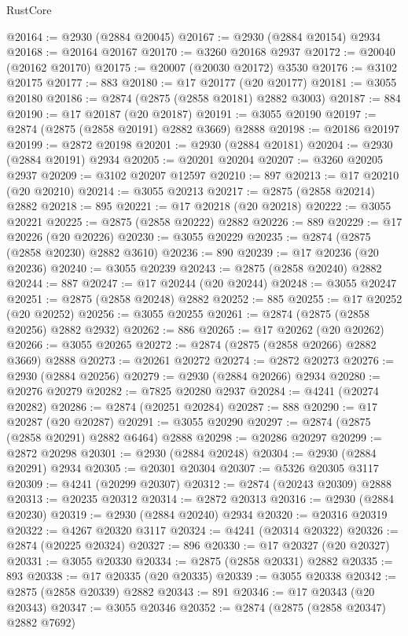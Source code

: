 \begin{lexlean}{RustCore}
\begin{coremodule}
@20164 := @2930 (@2884 @20045)
@20167 := @2930 (@2884 @20154) @2934
@20168 := @20164 @20167
@20170 := @3260 @20168 @2937
@20172 := @20040 (@20162 @20170)
@20175 := @20007 (@20030 @20172) @3530
@20176 := @3102 @20175
@20177 := 883
@20180 := @17 @20177 (@20 @20177)
@20181 := @3055 @20180
@20186 := @2874 (@2875 (@2858 @20181) @2882 @3003)
@20187 := 884
@20190 := @17 @20187 (@20 @20187)
@20191 := @3055 @20190
@20197 := @2874 (@2875 (@2858 @20191) @2882 @3669) @2888
@20198 := @20186 @20197
@20199 := @2872 @20198
@20201 := @2930 (@2884 @20181)
@20204 := @2930 (@2884 @20191) @2934
@20205 := @20201 @20204
@20207 := @3260 @20205 @2937
@20209 := @3102 @20207 @12597
@20210 := 897
@20213 := @17 @20210 (@20 @20210)
@20214 := @3055 @20213
@20217 := @2875 (@2858 @20214) @2882
@20218 := 895
@20221 := @17 @20218 (@20 @20218)
@20222 := @3055 @20221
@20225 := @2875 (@2858 @20222) @2882
@20226 := 889
@20229 := @17 @20226 (@20 @20226)
@20230 := @3055 @20229
@20235 := @2874 (@2875 (@2858 @20230) @2882 @3610)
@20236 := 890
@20239 := @17 @20236 (@20 @20236)
@20240 := @3055 @20239
@20243 := @2875 (@2858 @20240) @2882
@20244 := 887
@20247 := @17 @20244 (@20 @20244)
@20248 := @3055 @20247
@20251 := @2875 (@2858 @20248) @2882
@20252 := 885
@20255 := @17 @20252 (@20 @20252)
@20256 := @3055 @20255
@20261 := @2874 (@2875 (@2858 @20256) @2882 @2932)
@20262 := 886
@20265 := @17 @20262 (@20 @20262)
@20266 := @3055 @20265
@20272 := @2874 (@2875 (@2858 @20266) @2882 @3669) @2888
@20273 := @20261 @20272
@20274 := @2872 @20273
@20276 := @2930 (@2884 @20256)
@20279 := @2930 (@2884 @20266) @2934
@20280 := @20276 @20279
@20282 := @7825 @20280 @2937
@20284 := @4241 (@20274 @20282)
@20286 := @2874 (@20251 @20284)
@20287 := 888
@20290 := @17 @20287 (@20 @20287)
@20291 := @3055 @20290
@20297 := @2874 (@2875 (@2858 @20291) @2882 @6464) @2888
@20298 := @20286 @20297
@20299 := @2872 @20298
@20301 := @2930 (@2884 @20248)
@20304 := @2930 (@2884 @20291) @2934
@20305 := @20301 @20304
@20307 := @5326 @20305 @3117
@20309 := @4241 (@20299 @20307)
@20312 := @2874 (@20243 @20309) @2888
@20313 := @20235 @20312
@20314 := @2872 @20313
@20316 := @2930 (@2884 @20230)
@20319 := @2930 (@2884 @20240) @2934
@20320 := @20316 @20319
@20322 := @4267 @20320 @3117
@20324 := @4241 (@20314 @20322)
@20326 := @2874 (@20225 @20324)
@20327 := 896
@20330 := @17 @20327 (@20 @20327)
@20331 := @3055 @20330
@20334 := @2875 (@2858 @20331) @2882
@20335 := 893
@20338 := @17 @20335 (@20 @20335)
@20339 := @3055 @20338
@20342 := @2875 (@2858 @20339) @2882
@20343 := 891
@20346 := @17 @20343 (@20 @20343)
@20347 := @3055 @20346
@20352 := @2874 (@2875 (@2858 @20347) @2882 @7692)

\end{coremodule}
\end{lexlean}
